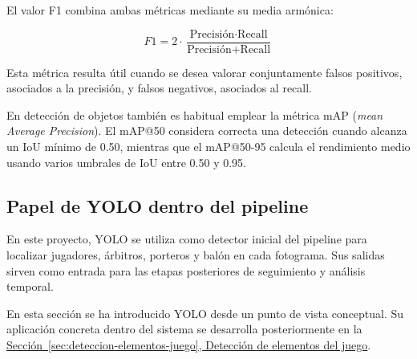 El valor F1 combina ambas métricas mediante su media armónica:

\[
F1 = 2 \cdot \frac{\text{Precisión} \cdot \text{Recall}}{\text{Precisión} + \text{Recall}}
\]

Esta métrica resulta útil cuando se desea valorar conjuntamente falsos positivos, asociados a la precisión, y falsos negativos, asociados al recall.

En detección de objetos también es habitual emplear la métrica mAP (\textit{mean Average Precision}). El mAP@50 considera correcta una detección cuando alcanza un IoU mínimo de 0.50, mientras que el mAP@50-95 calcula el rendimiento medio usando varios umbrales de IoU entre 0.50 y 0.95.


\subsection{Papel de YOLO dentro del pipeline}
En este proyecto, YOLO se utiliza como detector inicial del pipeline para localizar jugadores, árbitros, porteros y balón en cada fotograma. Sus salidas sirven como entrada para las etapas posteriores de seguimiento y análisis temporal.

En esta sección se ha introducido YOLO desde un punto de vista conceptual. Su aplicación concreta dentro del sistema se desarrolla posteriormente en la \hyperref[sec:deteccion-elementos-juego]{Sección~\ref*{sec:deteccion-elementos-juego}, Detección de elementos del juego}.
